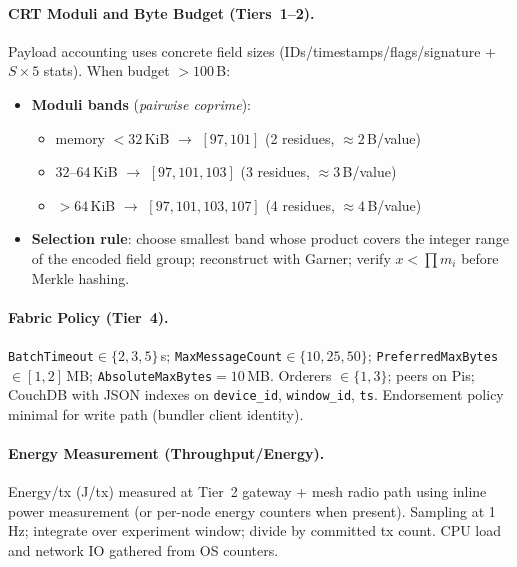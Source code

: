 \documentclass[12pt,onecolumn]{IEEEtran} %
\begin{document}
\paragraph{CRT Moduli and Byte Budget (Tiers~1--2).}
Payload accounting uses concrete field sizes (IDs/timestamps/flags/signature + $S\times5$ stats). When budget $>100$\,B:
\begin{itemize}[leftmargin=*, itemsep=0.1em]
  \item \textbf{Moduli bands} (\emph{pairwise coprime}): 
    \begin{itemize}[leftmargin=1.25em]
      \item memory $<32$\,KiB $\rightarrow$ $[97,101]$ (2 residues, $\approx 2$\,B/value)
      \item $32$--$64$\,KiB $\rightarrow$ $[97,101,103]$ (3 residues, $\approx 3$\,B/value)
      \item $>64$\,KiB $\rightarrow$ $[97,101,103,107]$ (4 residues, $\approx 4$\,B/value)
    \end{itemize}
  \item \textbf{Selection rule}: choose smallest band whose product covers the integer range of the encoded field group; reconstruct with Garner; verify $x<\prod m_i$ before Merkle hashing.
\end{itemize}

\paragraph{Fabric Policy (Tier~4).}
\texttt{BatchTimeout}$\in\{2,3,5\}$\,s; \texttt{MaxMessageCount}$\in\{10,25,50\}$; \texttt{PreferredMaxBytes}$\in[1,2]$\,MB; \texttt{AbsoluteMaxBytes}$=10$\,MB. Orderers $\in\{1,3\}$; peers on Pis; CouchDB with JSON indexes on \texttt{device\_id}, \texttt{window\_id}, \texttt{ts}. Endorsement policy minimal for write path (bundler client identity). 

\paragraph{Energy Measurement (Throughput/Energy).}
Energy/tx (J/tx) measured at Tier~2 gateway + mesh radio path using inline power measurement (or per-node energy counters when present). Sampling at 1\,Hz; integrate over experiment window; divide by committed tx count. CPU load and network IO gathered from OS counters.
\end{document}
